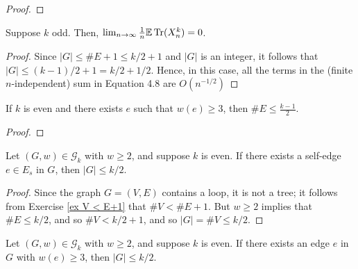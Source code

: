 \begin{proof}
  \notready
\end{proof}




\begin{proposition}
  \label{prop:odd_case}
  \notready
  Suppose $k$ odd. Then, $\lim_{n\to\infty} \frac{1}{n}\mathbb{E}\operatorname{Tr}(X_n^k) = 0$.
\end{proposition}

\begin{proof}
  \notready
  Since $|G|\le \#E+1 \le k/2+1$ and $|G|$ is an integer, it follows that $|G|\le (k-1)/2+1 = k/2 + 1/2$.  Hence, in this case, all the terms in the (finite $n$-independent) sum in Equation 4.8 are $O(n^{-1/2})$
\end{proof}

\begin{lemma}
  \label{lemma:edge_bound_large_w}
  \notready
  If $k$ is even and there exists $e$ such that $w(e) \ge 3$, then $\#E \le \frac{k-1}{2}$.
\end{lemma}

\begin{proof}
  \notready
\end{proof}



\begin{proposition}%
  \label{prop:g_bound_self_edge}
  \notready
  Let $(G,w)\in\mathcal{G}_k$ with $w\ge 2$, and suppose $k$ is even. If there exists a self-edge $e\in E_s$ in $G$, then $|G|\le k/2$.
\end{proposition}

\begin{proof}
  \notready
  Since the graph $G = (V,E)$ contains a loop, it is not a tree; it follows from Exercise \ref{ex V < E+1} that $\#V < \#E+1$.  But $w\ge 2$ implies that $\#E\le k/2$, and so $\#V < k/2+1$, and so $|G| = \#V \le k/2$.
\end{proof}

\begin{proposition}%
  \label{prop:g_bound_large_w}
  \notready
  Let $(G,w)\in\mathcal{G}_k$ with $w\ge 2$, and suppose $k$ is even. If there exists an edge $e$ in $G$ with $w(e)\ge 3$, then $|G|\le k/2$.
\end{proposition}

